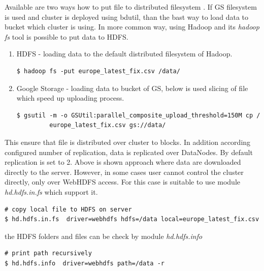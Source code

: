 \documentclass[a4paper,12pt,oneside]{report}
\begin{document}
 	Available are two ways how to put file to distributed filesystem . If GS filesystem is used and cluster is deployed using bdutil, than the bast way to load data to bucket which cluster is using. In more common way, using Hadoop and its \textit{hadoop fs} tool is possible to put data to HDFS.
\begin{enumerate}
\item HDFS  - loading data to the default distributed filesystem of Hadoop.
	\begin{footnotesize}
		\begin{lstlisting}[style=python]
$ hadoop fs -put europe_latest_fix.csv /data/
		\end{lstlisting}
	\end{footnotesize}
\item Google Storage - loading data to bucket of GS, below is used slicing of file which speed up uploading process.
	\begin{footnotesize}
		\begin{lstlisting}[style=python]
$ gsutil -m -o GSUtil:parallel_composite_upload_threshold=150M cp /
		 europe_latest_fix.csv gs://data/
		\end{lstlisting}
	\end{footnotesize}
\end{enumerate}
This ensure that file is distributed over cluster to blocks. In addition according  configured number of replication, data is replicated over DataNodes. By default replication is set to 2.
Above is shown approach where data are downloaded directly to the server. However, in some cases user cannot control the cluster directly, only over WebHDFS access. For this case is suitable to use module \textit{hd.hdfs.in.fs} which support it.
	\begin{footnotesize}
		\begin{lstlisting}[style=python]
# copy local file to HDFS on server
$ hd.hdfs.in.fs  driver=webhdfs hdfs=/data local=europe_latest_fix.csv
		\end{lstlisting}
	\end{footnotesize}
the HDFS folders and files can be check by module \textit{hd.hdfs.info}
	\begin{footnotesize}
		\begin{lstlisting}[style=python]
# print path recursively
$ hd.hdfs.info  driver=webhdfs path=/data -r
		\end{lstlisting}
	\end{footnotesize}
\end{document}
